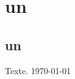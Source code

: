 \documentclass[%
]{EcoleLecture}
\begin{document}
\section{un}
\lipsum[1]

\subsection{un}
\lipsum[1]


Texte. \today{} \thistime
\begin{colonnes}
\lipsum
\end{colonnes}
\end{document}

